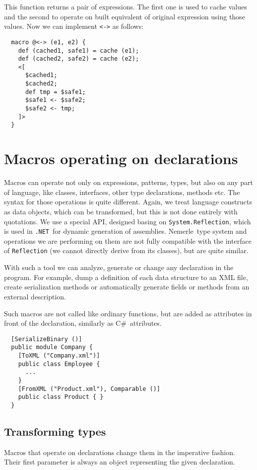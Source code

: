 \documentclass{llncs}
\newcommand{\net}[0]{{\tt .NET}}
\newcommand{\nem}[0]{Nemerle}
\newcommand{\cs}[0]{C\#}
\begin{document}
This function returns a pair of expressions. The first one is used to cache values
and the second to operate on built equivalent of original expression using those values.
Now we can implement \verb,<->, as follows:

\begin{verbatim}
  macro @<-> (e1, e2) {
    def (cached1, safe1) = cache (e1);
    def (cached2, safe2) = cache (e2);    
    <[
      $cached1;
      $cached2;
      def tmp = $safe1;
      $safe1 <- $safe2;
      $safe2 <- tmp;
    ]>
  }
\end{verbatim}

\section{Macros operating on declarations} \label{Declarations}
Macros can operate not only on expressions, patterns, types, but also on
any part of language, like classes, interfaces, other type declarations,
methods etc. The syntax for those operations is quite different. Again, we
treat language constructs as data objects, which can be transformed, but
this is not done entirely with quotations. We use a special API, designed 
basing on \verb,System.Reflection,, which is used in \net\ for dynamic
generation of assemblies. \nem\ type system and operations we are performing
on them are not fully compatible with the interface of \verb,Reflection, 
(we cannot directly derive from its classes), but are quite similar.

With such a tool we can analyze, generate or change any declaration
in the program. For example, dump a definition of each data structure 
to an XML file, create serialization methods or automatically
generate fields or methods from an external description.

Such macros are not called like ordinary functions, but are added as
attributes in front of the declaration, similarly as \cs\ attributes.

\begin{verbatim}
  [SerializeBinary ()] 
  public module Company {
    [ToXML ("Company.xml")] 
    public class Employee {
      ...
    }
    [FromXML ("Product.xml"), Comparable ()] 
    public class Product { }
  }
\end{verbatim}

\subsection{Transforming types}
Macros that operate on declarations change them in the imperative fashion.
Their first parameter is always an object representing the given 
declaration. 
\end{document}
